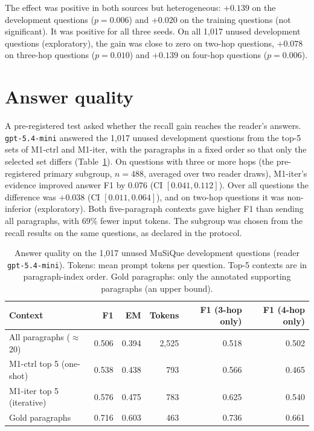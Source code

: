 The effect was positive in both sources but heterogeneous: $+0.139$ on the development questions ($p=0.006$) and $+0.020$ on the training questions (not significant). It was positive for all three seeds. On all 1,017 unused development questions (exploratory), the gain was close to zero on two-hop questions, $+0.078$ on three-hop questions ($p=0.010$) and $+0.139$ on four-hop questions ($p=0.006$).

\section{Answer quality}
\label{sec:res_f1}

A pre-registered test asked whether the recall gain reaches the reader's answers. \texttt{gpt-5.4-mini} answered the 1,017 unused development questions from the top-5 sets of M1-ctrl and M1-iter, with the paragraphs in a fixed order so that only the selected set differs (Table~\ref{tab:f1}). On questions with three or more hops (the pre-registered primary subgroup, $n=488$, averaged over two reader draws), M1-iter's evidence improved answer F1 by 0.076 (CI $[0.041, 0.112]$). Over all questions the difference was $+0.038$ (CI $[0.011, 0.064]$), and on two-hop questions it was non-inferior (exploratory). Both five-paragraph contexts gave higher F1 than sending all paragraphs, with 69\% fewer input tokens. The subgroup was chosen from the recall results on the same questions, as declared in the protocol.

\begin{table}[htbp]
\centering
\caption{Answer quality on the 1,017 unused MuSiQue development questions (reader \texttt{gpt-5.4-mini}). Tokens: mean prompt tokens per question. Top-5 contexts are in paragraph-index order. Gold paragraphs: only the annotated supporting paragraphs (an upper bound).}
\label{tab:f1}
\small
\begin{tabular}{lrrrrr}
\toprule
Context & F1 & EM & Tokens & F1 (3-hop only) & F1 (4-hop only) \\
\midrule
All paragraphs ($\approx$20) & 0.506 & 0.394 & 2,525 & 0.518 & 0.502 \\
M1-ctrl top 5 (one-shot) & 0.538 & 0.438 & 793 & 0.566 & 0.465 \\
M1-iter top 5 (iterative) & 0.576 & 0.475 & 783 & 0.625 & 0.540 \\
Gold paragraphs & 0.716 & 0.603 & 463 & 0.736 & 0.661 \\
\bottomrule
\end{tabular}
\end{table}

